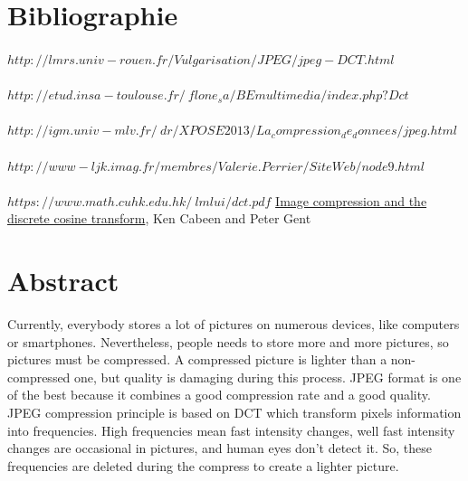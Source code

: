 \documentclass[12pt]{article}
\begin{document}
\section{Bibliographie}
\paragraph{}
$http://lmrs.univ-rouen.fr/Vulgarisation/JPEG/jpeg-DCT.html$
\paragraph{}
$http://etud.insa-toulouse.fr/~flone_sa/BEmultimedia/index.php?Dct$
\paragraph{}
$http://igm.univ-mlv.fr/~dr/XPOSE2013/La_compression_de_donnees/jpeg.html$
\paragraph{}
$http://www-ljk.imag.fr/membres/Valerie.Perrier/SiteWeb/node9.html$
\paragraph{}
$https://www.math.cuhk.edu.hk/~lmlui/dct.pdf$
\newline
\underline{Image compression and the discrete cosine transform}, Ken Cabeen and Peter Gent

\section{Abstract}
Currently, everybody stores a lot of pictures on numerous devices, like computers or smartphones. Nevertheless, people needs to store more and more pictures, so pictures must be compressed. A compressed picture is lighter than a non-compressed one, but quality is damaging during this process. JPEG format is one of the best because it combines a good compression rate and a good quality. JPEG compression principle is based on DCT which transform pixels information into frequencies. High frequencies mean fast intensity changes, well fast intensity changes are occasional in pictures, and human eyes don’t detect it. So, these frequencies are deleted during the compress to create a lighter picture.
\end{document}
